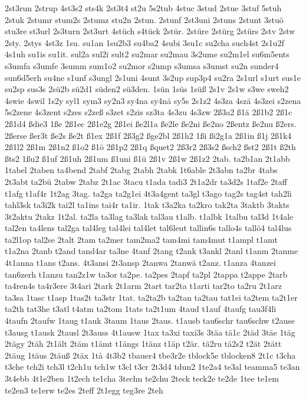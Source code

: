 {2st3run
2strup
4st3s2
sts4k
2st3t4
st2u
5s2tub
4stuc
3stud
2stue
3stuf
5stuh
2stuk
2stumr
stum2s
2stumz
stu2n
2stun.
2stunf
2st3uni
2stuns
2stunt
3stuö
stu3re
st3url
2s3turn
2st3urt
4stüch
s4tück
2stür.
2stüre
2stürg
2stürs
2stv
2stw
2sty.
2stys
4st3z
1su.
su1an
1su2b3
su4ba2
4subi
3su1c
su2cha
such4st
2s1u2f
4s1uh
su1is
su1it.
sul2a
sul2i
sult2
su2mar
su2mau
3s2ume
su2m1el
su6m5ents
s3umfa
s3umfe
3summ
sum1o2
su2mor
s2ump
s3umsa
s3umst
su2n
sunder4
sun6d5erh
su4ne
s1unf
s3ungl
2s1uni
4sunt
3s2up
sup3p4
su2ra
2s1url
s1urt
sus1e
su2sp
sus3s
2sü2b
sü2d1
süden2
sü3den.
1sün
1süs
1süß
2s1v
2s1w
s3we
sweh2
4swie
4swil
1s2y
syl1
sym3
sy2n3
sy4na
sy4nä
sy5s
2s1z2
4s3za
4szä
4s3zei
s2zena
5s2zene
4s3zent
s2zes
s2zeß
s3zet
s2zis
sz3ta
4s3zu
4s3zw
2ß3a2
ß1ä
2ß1b2
2ß1c
2ß1d4
ßdie3
1ße
2ß1ec
2ß1e2g
2ß1ei
ße2l1a
ße2le
ße2ni
ße2no
2ßentz
ße2nu
ß2ers.
2ßerse
ßer3t
ße2s
ße2t
ß1ex
2ß1f
2ß3g2
ßge2bl
2ß1h2
1ßi
ßi2g1a
2ß1in
ß1j
2ß1k4
2ß1l2
2ß1m
2ß1n2
ß1o2
ß1ö
2ß1p2
2ß1q
ßquet2
2ß3r2
2ß3s2
ßsch2
ßst2
2ß1t
ß2th
ßts2
1ßu2
ß1uf
2ß1uh
2ß1um
ß1uni
ß1ü
2ß1v
2ß1w
2ß1z2
2tab.
ta2b1an
2t1abb
1tabel
2taben
ta4bend
2tabf
2tabg
2tabh
2tabk
1t6able
2t3abn
ta2br
4tabs
2t3abt
ta2bü
2tabw
2tabz
2t1ac
3tacu
t1ada
tadi3
2t1a2dr
ta3d2s
1taf2e
2taff
t1afg
t1af4r
1t2ag
3tag.
ta2ga
ta2g1ei
4t3a4gent
ta3gl
t3ago
tag2s
tag4st
tah2li
tahl3sk
ta3i2k
tai2l
ta1ins
tai4r
ta1ir.
1tak
t3a2ka
ta2kro
tak2ta
3taktb
3takts
3t2aktu
2takz
1t2al.
ta2la
ta3lag
ta3lak
tal3au
t1alb.
t1albk
1talbu
tal3d
1t4ale
tal2en
ta4lens
tal2ga
tal4leg
tal4lei
tal4let
tal6leut
tallin6s
tallo4s
tallö4
tal4lus
ta2l1op
tal2se
2talt
2tam
ta2mer
tam2ma2
tam4mi
tam4mut
t1ampl
t1amt
t1a2na
2tanb
t2and
tand4ar
ta3ne
4tanf
2tang
t2ank
t3ankl
2tanl
t1anm
2tanme
4t1anna
t1ans
t2ans.
4t3ansi
2t3ansp
2tanwa
2tanwä
t2anz.
t1anza
4tanzei
tan6zerh
t1anzu
tan2z1w
ta3or
ta2pe.
ta2pes
2tapf
ta2pl
2tappa
t2appe
2tarb
ta4ren4s
ta4r3ere
3t4ari
2tark
2t1arm
2tart
tar2ta
t1arti
tar2to
ta2ru
2t1arz
ta3sa
1tasc
t1asp
1tas2t
ta3str
1tat.
ta2ta2b
ta2tan
ta2tau
tat1ei
ta2tem
ta2t1er
ta2th
tat3he
t3atl
t4atm
ta2tom
1tats
ta2t1um
4taud
t1auf
4taufg
tau3f4li
4taufn
2taufw
1taug
t1auk
3taum
1taus
2taus.
t1ausb
tau6schr
tau6schw
t2ause
t3ausg
t1ausk
2tausl
2t3auss
4t1ausw
1tax
ta3xi
taxi3s
3täa
tä1c
2täd
3täe
1täg
2tägy
2täh
2t1ält
2täm
t1ämt
t1ängs
1tänz
t1äp
t2är.
tä2ru
tä2s2
t2ät
2tätt
2täug
1täus
2täuß
2täx
1tà
4t3b2
tbauer4
tbe3r2e
tblock5e
tblocken8
2t1c
t3cha
t3che
tch2i
tch3l
t2ch1u
tch1w
t3cl
t3cr
2t3d4
tdun2
1te2a4
te3al
teamma5
te3an
3t4ebb
4t1e2ben
1t2ech
te1cha
3techn
te2chu
2teck
teck2e
te2de
1tee
te1em
te2en3
te1erw
te2es
2teff
2t1egg
teg3re
2teh
}
